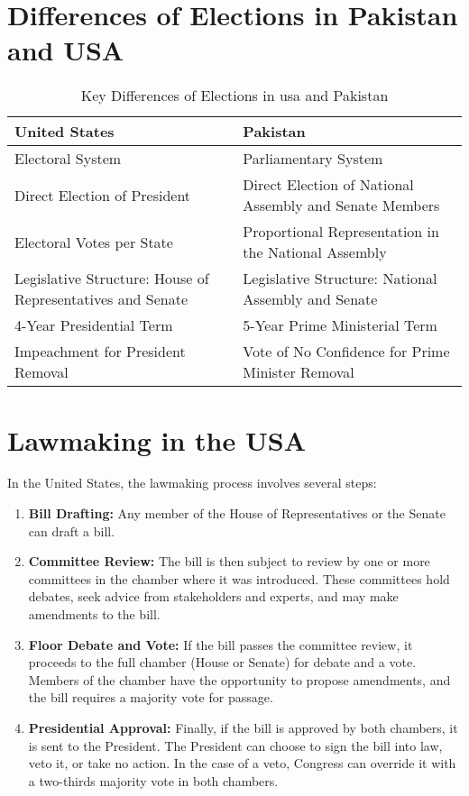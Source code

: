 \documentclass{article}
\begin{document}
\section{Differences of Elections in Pakistan and USA}
\begin{table}[H] %
\centering
\caption{Key Differences of Elections in usa and Pakistan}
\begin{tabularx}{\textwidth}{X|X}
\toprule
\textbf{United States} & \textbf{Pakistan} \\
\midrule
Electoral System & Parliamentary System \\
Direct Election of President & Direct Election of National Assembly and Senate Members \\
Electoral Votes per State & Proportional Representation in the National Assembly \\
Legislative Structure: House of Representatives and Senate & Legislative Structure: National Assembly and Senate \\
4-Year Presidential Term & 5-Year Prime Ministerial Term \\
Impeachment for President Removal & Vote of No Confidence for Prime Minister Removal \\
\bottomrule
\end{tabularx}
\end{table}

\section{Lawmaking in the USA}
In the United States, the lawmaking process involves several steps:
\begin{enumerate}[label=\arabic*.]
    \item \textbf{Bill Drafting:} Any member of the House of Representatives or the Senate can draft a bill.
    
    \item \textbf{Committee Review:} The bill is then subject to review by one or more committees in the chamber where it was introduced. These committees hold debates, seek advice from stakeholders and experts, and may make amendments to the bill.
    
    \item \textbf{Floor Debate and Vote:} If the bill passes the committee review, it proceeds to the full chamber (House or Senate) for debate and a vote. Members of the chamber have the opportunity to propose amendments, and the bill requires a majority vote for passage.
    
    \item \textbf{Presidential Approval:} Finally, if the bill is approved by both chambers, it is sent to the President. The President can choose to sign the bill into law, veto it, or take no action. In the case of a veto, Congress can override it with a two-thirds majority vote in both chambers.
\end{enumerate}
\end{document}
